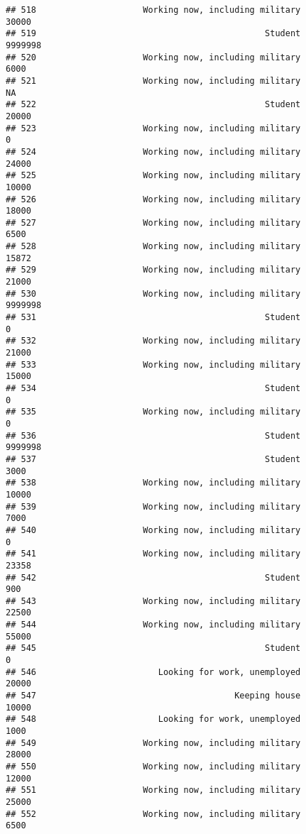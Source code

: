 \documentclass[]{book}
\theoremstyle{definition}
\theoremstyle{definition}
\theoremstyle{remark}
\begin{document}
\begin{verbatim}
## 518                     Working now, including military           30000
## 519                                             Student         9999998
## 520                     Working now, including military            6000
## 521                     Working now, including military              NA
## 522                                             Student           20000
## 523                     Working now, including military               0
## 524                     Working now, including military           24000
## 525                     Working now, including military           10000
## 526                     Working now, including military           18000
## 527                     Working now, including military            6500
## 528                     Working now, including military           15872
## 529                     Working now, including military           21000
## 530                     Working now, including military         9999998
## 531                                             Student               0
## 532                     Working now, including military           21000
## 533                     Working now, including military           15000
## 534                                             Student               0
## 535                     Working now, including military               0
## 536                                             Student         9999998
## 537                                             Student            3000
## 538                     Working now, including military           10000
## 539                     Working now, including military            7000
## 540                     Working now, including military               0
## 541                     Working now, including military           23358
## 542                                             Student             900
## 543                     Working now, including military           22500
## 544                     Working now, including military           55000
## 545                                             Student               0
## 546                        Looking for work, unemployed           20000
## 547                                       Keeping house           10000
## 548                        Looking for work, unemployed            1000
## 549                     Working now, including military           28000
## 550                     Working now, including military           12000
## 551                     Working now, including military           25000
## 552                     Working now, including military            6500

\end{verbatim}
\end{document}
